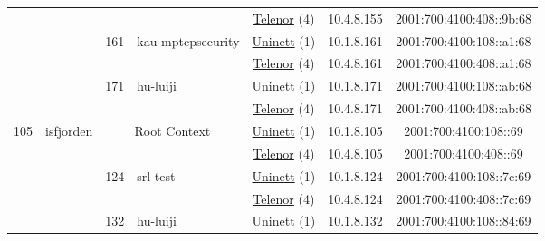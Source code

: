 \begin{small}
\begin{center}
\begin{longtable}{|c|c|c|c|c|c|c|c|}
  &  &  &  & \multicolumn{2}{|c|}{\tiny{\href{https://www.telenor.no}{Telenor} (4)}} & \tiny{10.4.8.155} & \tiny{2001:700:4100:408::9b:68} \\* \cline{3-3}\cline{4-4}\cline{5-5}\cline{6-6}\cline{7-7}\cline{8-8}
  &  & \multirow{2}{*}{\tiny{161}} & \multicolumn{1}{|l|}{\multirow{2}{*}{\tiny{kau-mptcpsecurity}}} & \multicolumn{2}{|c|}{\tiny{\href{https://www.uninett.no}{Uninett} (1)}} & \tiny{10.1.8.161} & \tiny{2001:700:4100:108::a1:68} \\* \cline{5-5}\cline{6-6}\cline{7-7}\cline{8-8}
  &  &  &  & \multicolumn{2}{|c|}{\tiny{\href{https://www.telenor.no}{Telenor} (4)}} & \tiny{10.4.8.161} & \tiny{2001:700:4100:408::a1:68} \\* \cline{3-3}\cline{4-4}\cline{5-5}\cline{6-6}\cline{7-7}\cline{8-8}
  &  & \multirow{2}{*}{\tiny{171}} & \multicolumn{1}{|l|}{\multirow{2}{*}{\tiny{hu-luiji}}} & \multicolumn{2}{|c|}{\tiny{\href{https://www.uninett.no}{Uninett} (1)}} & \tiny{10.1.8.171} & \tiny{2001:700:4100:108::ab:68} \\* \cline{5-5}\cline{6-6}\cline{7-7}\cline{8-8}
  &  &  &  & \multicolumn{2}{|c|}{\tiny{\href{https://www.telenor.no}{Telenor} (4)}} & \tiny{10.4.8.171} & \tiny{2001:700:4100:408::ab:68} \\ \hline
 \multirow{18}{*}{\tiny{105}} & \multicolumn{1}{|l|}{\multirow{18}{*}{\tiny{isfjorden}}} & \multicolumn{2}{|c|}{\multirow{2}{*}{\tiny{Root Context}}} & \multicolumn{2}{|c|}{\tiny{\href{https://www.uninett.no}{Uninett} (1)}} & \tiny{10.1.8.105} & \tiny{2001:700:4100:108::69} \\* \cline{5-5}\cline{6-6}\cline{7-7}\cline{8-8}
  &  & \multicolumn{2}{|c|}{} & \multicolumn{2}{|c|}{\tiny{\href{https://www.telenor.no}{Telenor} (4)}} & \tiny{10.4.8.105} & \tiny{2001:700:4100:408::69} \\* \cline{3-3}\cline{4-4}\cline{5-5}\cline{6-6}\cline{7-7}\cline{8-8}
  &  & \multirow{2}{*}{\tiny{124}} & \multicolumn{1}{|l|}{\multirow{2}{*}{\tiny{srl-test}}} & \multicolumn{2}{|c|}{\tiny{\href{https://www.uninett.no}{Uninett} (1)}} & \tiny{10.1.8.124} & \tiny{2001:700:4100:108::7c:69} \\* \cline{5-5}\cline{6-6}\cline{7-7}\cline{8-8}
  &  &  &  & \multicolumn{2}{|c|}{\tiny{\href{https://www.telenor.no}{Telenor} (4)}} & \tiny{10.4.8.124} & \tiny{2001:700:4100:408::7c:69} \\* \cline{3-3}\cline{4-4}\cline{5-5}\cline{6-6}\cline{7-7}\cline{8-8}
  &  & \multirow{2}{*}{\tiny{132}} & \multicolumn{1}{|l|}{\multirow{2}{*}{\tiny{hu-luiji}}} & \multicolumn{2}{|c|}{\tiny{\href{https://www.uninett.no}{Uninett} (1)}} & \tiny{10.1.8.132} & \tiny{2001:700:4100:108::84:69} \\* \cline{5-5}\cline{6-6}\cline{7-7}\cline{8-8}

\end{longtable}
\end{center}
\end{small}

